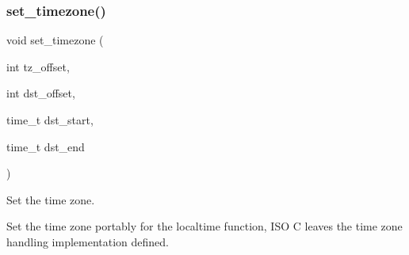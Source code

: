 \subsubsection{\texorpdfstring{set\+\_\+timezone()}{set\_timezone()}}
{\footnotesize\ttfamily void set\+\_\+timezone (\begin{DoxyParamCaption}\item[{int}]{tz\+\_\+offset,  }\item[{int}]{dst\+\_\+offset,  }\item[{time\+\_\+t}]{dst\+\_\+start,  }\item[{time\+\_\+t}]{dst\+\_\+end }\end{DoxyParamCaption})}



Set the time zone. 

Set the time zone portably for the localtime function, I\+SO C leaves the time zone handling implementation defined. 